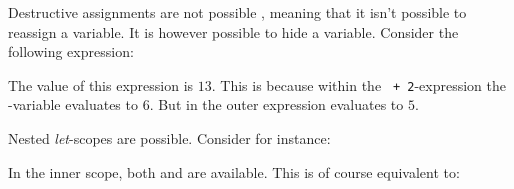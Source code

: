 Destructive assignments are not possible \productname{}, meaning that it isn't possible to 
reassign a variable. It is however possible to hide a variable.
Consider the following expression:


The value of this expression is $13$. This is because within the \texttt{ + 2}-expression
the -variable evaluates to $6$. But in the outer expression  evaluates to
$5$.

Nested \emph{let}-scopes are possible. Consider for instance:


In the inner scope, both  and  are available. This is of course equivalent
to:



